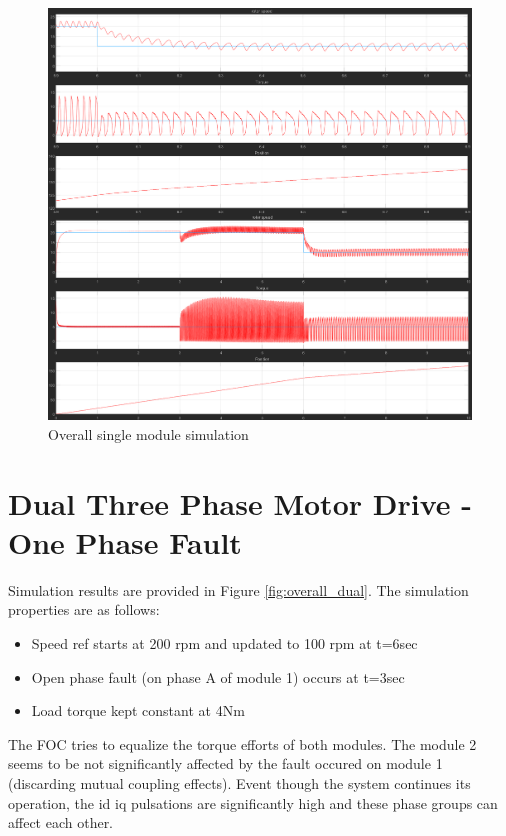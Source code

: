 \documentclass{article}
\begin{document}
\begin{figure}[h!]
\centering
\includegraphics[scale=0.3]{Figures/SingleModule/Overall.png}
\caption{Overall single module simulation}
\label{fig:overall_single}
\end{figure}


\section{Dual Three Phase Motor Drive - One Phase Fault}
Simulation results are provided in Figure \ref{fig:overall_dual}. The simulation properties are as follows:

\begin{itemize}
    \item Speed ref starts at 200 rpm and updated to 100 rpm at t=6sec
    \item Open phase fault (on phase A of module 1)  occurs at t=3sec
    \item Load torque kept constant at 4Nm
\end{itemize}

The FOC tries to equalize the torque efforts of both modules. The module 2 seems to be not significantly affected by the fault occured on module 1 (discarding mutual coupling effects). Event though the system continues its operation, the id iq pulsations are significantly high and these phase groups can affect each other.
\end{document}
